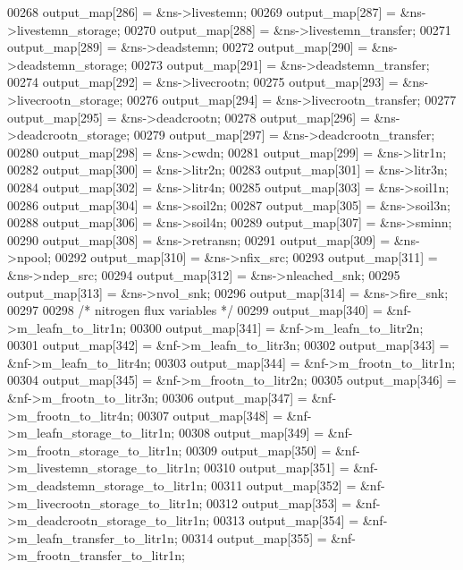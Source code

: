\begin{DoxyCode}
00268         output\_map[286] = &ns->livestemn;
00269         output\_map[287] = &ns->livestemn\_storage;
00270         output\_map[288] = &ns->livestemn\_transfer;
00271         output\_map[289] = &ns->deadstemn;
00272         output\_map[290] = &ns->deadstemn\_storage;
00273         output\_map[291] = &ns->deadstemn\_transfer;
00274         output\_map[292] = &ns->livecrootn;
00275         output\_map[293] = &ns->livecrootn\_storage;
00276         output\_map[294] = &ns->livecrootn\_transfer;
00277         output\_map[295] = &ns->deadcrootn;
00278         output\_map[296] = &ns->deadcrootn\_storage;
00279         output\_map[297] = &ns->deadcrootn\_transfer;
00280         output\_map[298] = &ns->cwdn;
00281         output\_map[299] = &ns->litr1n;
00282         output\_map[300] = &ns->litr2n;
00283         output\_map[301] = &ns->litr3n;
00284         output\_map[302] = &ns->litr4n;
00285         output\_map[303] = &ns->soil1n;
00286         output\_map[304] = &ns->soil2n;
00287         output\_map[305] = &ns->soil3n;
00288         output\_map[306] = &ns->soil4n;
00289         output\_map[307] = &ns->sminn;
00290         output\_map[308] = &ns->retransn;
00291         output\_map[309] = &ns->npool;
00292         output\_map[310] = &ns->nfix\_src;
00293         output\_map[311] = &ns->ndep\_src;
00294         output\_map[312] = &ns->nleached\_snk;
00295         output\_map[313] = &ns->nvol\_snk;
00296         output\_map[314] = &ns->fire\_snk;
00297         
00298         \textcolor{comment}{/* nitrogen flux variables */}
00299         output\_map[340] = &nf->m\_leafn\_to\_litr1n;
00300         output\_map[341] = &nf->m\_leafn\_to\_litr2n;
00301         output\_map[342] = &nf->m\_leafn\_to\_litr3n;
00302         output\_map[343] = &nf->m\_leafn\_to\_litr4n;
00303         output\_map[344] = &nf->m\_frootn\_to\_litr1n;
00304         output\_map[345] = &nf->m\_frootn\_to\_litr2n;
00305         output\_map[346] = &nf->m\_frootn\_to\_litr3n;
00306         output\_map[347] = &nf->m\_frootn\_to\_litr4n;
00307         output\_map[348] = &nf->m\_leafn\_storage\_to\_litr1n;
00308         output\_map[349] = &nf->m\_frootn\_storage\_to\_litr1n;
00309         output\_map[350] = &nf->m\_livestemn\_storage\_to\_litr1n;
00310         output\_map[351] = &nf->m\_deadstemn\_storage\_to\_litr1n;
00311         output\_map[352] = &nf->m\_livecrootn\_storage\_to\_litr1n;
00312         output\_map[353] = &nf->m\_deadcrootn\_storage\_to\_litr1n;
00313         output\_map[354] = &nf->m\_leafn\_transfer\_to\_litr1n;
00314         output\_map[355] = &nf->m\_frootn\_transfer\_to\_litr1n;

\end{DoxyCode}

